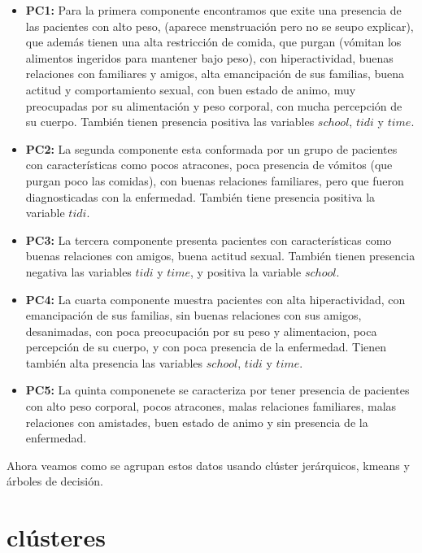 \documentclass[a4paper,10pt,twocolumn]{article}
\begin{document}
	\begin{itemize}
		\item \textbf{PC1:} Para la primera componente encontramos que exite una presencia de las pacientes con alto peso, (aparece menstruación pero no se seupo explicar), que además tienen una alta restricción de comida, que purgan (vómitan los alimentos ingeridos para mantener bajo peso), con hiperactividad, buenas relaciones con familiares y amigos, alta emancipación de sus familias, buena actitud y comportamiento sexual, con buen estado de animo, muy preocupadas por su alimentación y peso corporal, con mucha percepción de su cuerpo. También tienen presencia positiva las variables $school$, $tidi$ y $time$.
		
		\item \textbf{PC2:} La segunda componente esta conformada por un grupo de pacientes con características como pocos atracones, poca presencia de vómitos (que purgan poco las comidas), con buenas relaciones familiares, pero que fueron diagnosticadas con la enfermedad. También tiene presencia positiva la variable $tidi$.
		
		\item \textbf{PC3:} La tercera componente presenta pacientes con características como buenas relaciones con amigos, buena actitud sexual. También tienen presencia negativa las variables $tidi$ y $time$, y positiva la variable $school$.
		
		\item \textbf{PC4:} La cuarta componente muestra pacientes con alta hiperactividad, con emancipación de sus familias, sin buenas relaciones con sus amigos, desanimadas, con poca preocupación por su peso y alimentacion, poca percepción de su cuerpo, y con poca presencia de la enfermedad. Tienen también alta presencia las variables $school$, $tidi$ y $time$.
		
		\item \textbf{PC5:} La quinta componenete se caracteriza por tener presencia de pacientes con alto peso corporal, pocos atracones, malas relaciones familiares, malas relaciones con amistades, buen estado de animo y sin presencia de la enfermedad.
	\end{itemize}
	
	Ahora veamos como se agrupan estos datos usando clúster jerárquicos, kmeans y árboles de decisión.
	
	\section{clústeres}\label{sec:clústeres}
	
\end{document}
